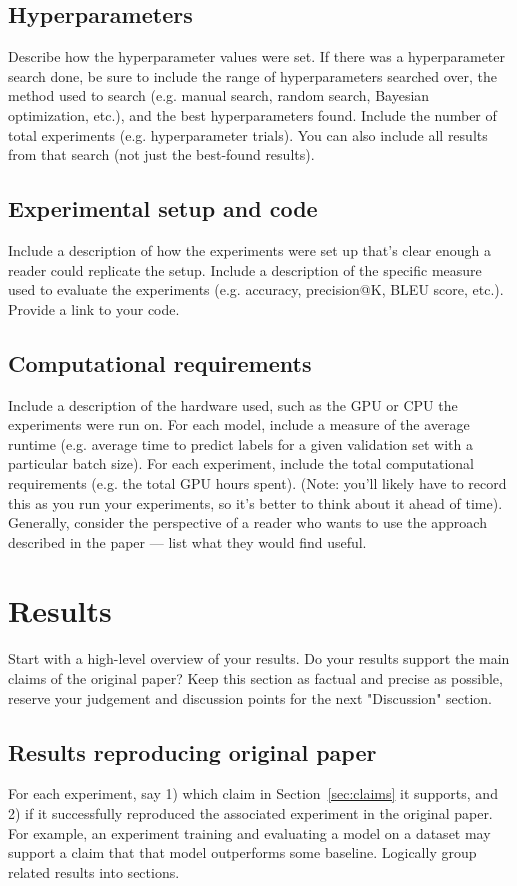 \subsection{Hyperparameters}
Describe how the hyperparameter values were set. If there was a hyperparameter search done, be sure to include the range of hyperparameters searched over, the method used to search (e.g. manual search, random search, Bayesian optimization, etc.), and the best hyperparameters found. Include the number of total experiments (e.g. hyperparameter trials). You can also include all results from that search (not just the best-found results).

\subsection{Experimental setup and code}
Include a description of how the experiments were set up that's clear enough a reader could replicate the setup. 
Include a description of the specific measure used to evaluate the experiments (e.g. accuracy, precision@K, BLEU score, etc.). 
Provide a link to your code.

\subsection{Computational requirements}
Include a description of the hardware used, such as the GPU or CPU the experiments were run on. 
For each model, include a measure of the average runtime (e.g. average time to predict labels for a given validation set with a particular batch size).
For each experiment, include the total computational requirements (e.g. the total GPU hours spent).
(Note: you'll likely have to record this as you run your experiments, so it's better to think about it ahead of time). Generally, consider the perspective of a reader who wants to use the approach described in the paper --- list what they would find useful.

\section{Results}
\label{sec:results}
Start with a high-level overview of your results. Do your results support the main claims of the original paper? Keep this section as factual and precise as possible, reserve your judgement and discussion points for the next "Discussion" section. 


\subsection{Results reproducing original paper}
For each experiment, say 1) which claim in Section~\ref{sec:claims} it supports, and 2) if it successfully reproduced the associated experiment in the original paper. 
For example, an experiment training and evaluating a model on a dataset may support a claim that that model outperforms some baseline.
Logically group related results into sections. 

